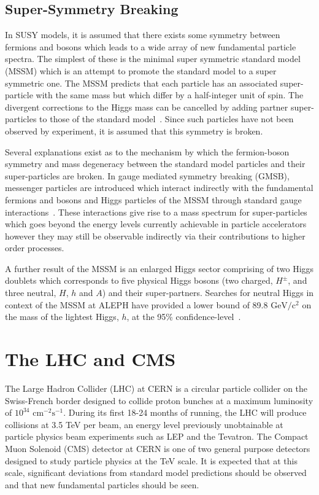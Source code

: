 \documentclass[a4paper,10pt]{article}
\begin{document}
\subsection{Super-Symmetry Breaking}
In SUSY models, it is assumed that there exists some symmetry between fermions and bosons which leads to a wide array of new fundamental particle spectra.
The simplest of these is the minimal super symmetric standard model (MSSM) which is an attempt to promote the standard model to a super symmetric one. The MSSM predicts that each particle has an 
associated super-particle with the same mass but which differ by a half-integer unit of spin. The divergent corrections to the Higgs mass can be cancelled by adding partner super-particles to 
those of the standard model~\cite{murayama-2000}. Since such particles have not been observed by experiment, it is assumed that this symmetry is broken. 
 
Several explanations exist as to the mechanism by which the fermion-boson symmetry and mass degeneracy between the standard model particles and their super-particles are broken.
In gauge mediated symmetry breaking (GMSB), messenger particles are introduced which interact indirectly with the fundamental fermions and bosons and Higgs particles of the MSSM through standard gauge
interactions~\cite{martin-1997}. These interactions give rise to a mass spectrum for super-particles which goes beyond the energy levels currently achievable in particle accelerators however they may still 
be observable indirectly via their contributions to higher order processes.

A further result of the MSSM is an enlarged Higgs sector comprising of two Higgs doublets which corresponds to five physical Higgs bosons (two charged, $H^\pm$, and three neutral, $H$, $h$ and $A$) and 
their super-partners. Searches for neutral Higgs in context of the MSSM at ALEPH have provided a lower bound of 89.8 $\mathrm{GeV/c^{2}}$ on the mass of the lightest Higgs, $h$, at the 95\% 
confidence-level~\cite{almssm}.

\section{The LHC and CMS}
The Large Hadron Collider (LHC) at CERN is a circular particle collider on the Swiss-French border designed to collide proton bunches at a maximum luminosity of $10^{34}$ $\mathrm{cm^{-2}s^{-1}}$.
During its first 18-24 months of running, the LHC will produce collisions at 3.5 TeV per beam, an energy level previously unobtainable at particle physics beam experiments such as LEP and the Tevatron.
The Compact Muon Solenoid (CMS) detector at CERN is one of two general purpose detectors designed to study particle physics at the TeV scale. It is expected that at this scale, significant deviations 
from standard model predictions should be observed and that new fundamental particles should be seen.
\end{document}
